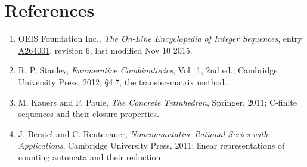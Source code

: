 \documentclass[11pt]{article}
\theoremstyle{definition}
\begin{document}
\section{References}

\begin{enumerate}

\item OEIS Foundation Inc., \emph{The On-Line Encyclopedia of Integer Sequences}, entry \href{https://oeis.org/A264001}{A264001}, revision 6, last modified Nov 10 2015.

\item R. P. Stanley, \emph{Enumerative Combinatorics}, Vol.~1, 2nd ed., Cambridge University Press, 2012; \S4.7, the transfer-matrix method.

\item M. Kauers and P. Paule, \emph{The Concrete Tetrahedron}, Springer, 2011; C-finite sequences and their closure properties.

\item J. Berstel and C. Reutenauer, \emph{Noncommutative Rational Series with Applications}, Cambridge University Press, 2011; linear representations of counting automata and their reduction.

\end{enumerate}
\end{document}
